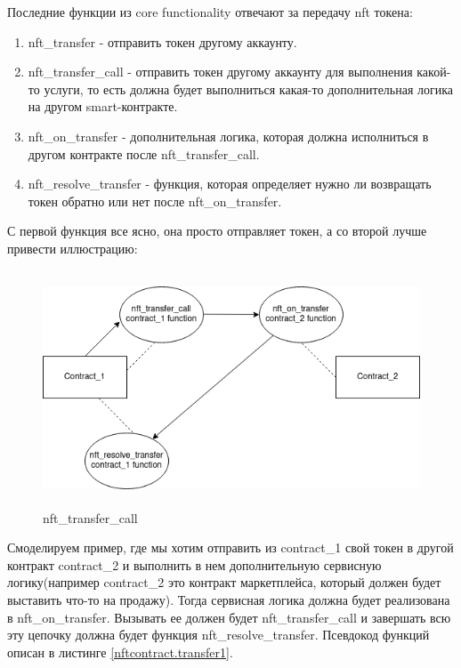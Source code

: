 Последние функции из core functionality отвечают за передачу nft токена:
\begin{enumerate}
\item nft\_transfer - отправить токен другому аккаунту.
\item nft\_transfer\_call - отправить токен другому аккаунту для выполнения какой-то услуги, то есть должна будет выполниться какая-то дополнительная логика на другом smart-контракте.
\item nft\_on\_transfer - дополнительная логика, которая должна исполниться в другом контракте после nft\_transfer\_call.
\item nft\_resolve\_transfer - функция, которая определяет нужно ли возвращать токен обратно или нет после nft\_on\_transfer.
\end{enumerate}
С первой функция все ясно, она просто отправляет токен, а со второй лучше привести иллюстрацию:

\begin{figure}[H]
	\centering
	\includegraphics[height=70mm]{fig/temp.png}
	\caption{nft\_transfer\_call}
\end{figure}

Смоделируем пример, где мы хотим отправить из contract\_1 свой токен в другой контракт contract\_2 и выполнить в нем дополнительную сервисную логику(например contract\_2 это контракт маркетплейса, который должен будет выставить что-то на продажу).
Тогда сервисная логика должна будет реализована в nft\_on\_transfer. Вызывать ее должен будет nft\_transfer\_call и завершать всю эту цепочку должна будет функция nft\_resolve\_transfer.
Псевдокод функций описан в листинге {\color{blue}\ref{nftcontract.transfer1}}.

